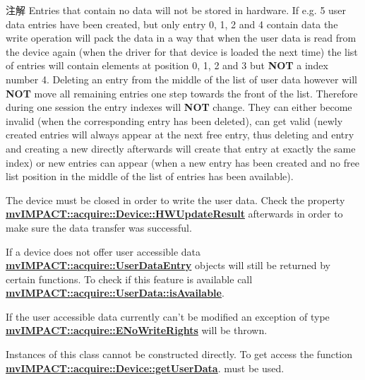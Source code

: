 \begin{DoxyNote}{注解}
Entries that contain no data will not be stored in hardware. If e.\+g. 5 user data entries have been created, but only entry 0, 1, 2 and 4 contain data the write operation will pack the data in a way that when the user data is read from the device again (when the driver for that device is loaded the next time) the list of entries will contain elements at position 0, 1, 2 and 3 but {\bfseries N\+O\+T} a index number 4. Deleting an entry from the middle of the list of user data however will {\bfseries N\+O\+T} move all remaining entries one step towards the front of the list. Therefore during one session the entry indexes will {\bfseries N\+O\+T} change. They can either become invalid (when the corresponding entry has been deleted), can get valid (newly created entries will always appear at the next free entry, thus deleting and entry and creating a new directly afterwards will create that entry at exactly the same index) or new entries can appear (when a new entry has been created and no free list position in the middle of the list of entries has been available).

The device must be closed in order to write the user data. Check the property {\bfseries \hyperlink{classmv_i_m_p_a_c_t_1_1acquire_1_1_device_a8e6d960358632d3e55f2f20474a3aa26}{mv\+I\+M\+P\+A\+C\+T\+::acquire\+::\+Device\+::\+H\+W\+Update\+Result}} afterwards in order to make sure the data transfer was successful.

If a device does not offer user accessible data {\bfseries \hyperlink{classmv_i_m_p_a_c_t_1_1acquire_1_1_user_data_entry}{mv\+I\+M\+P\+A\+C\+T\+::acquire\+::\+User\+Data\+Entry}} objects will still be returned by certain functions. To check if this feature is available call {\bfseries \hyperlink{classmv_i_m_p_a_c_t_1_1acquire_1_1_user_data_a1b86acbf21478b9eb2ea528d67cbfe09}{mv\+I\+M\+P\+A\+C\+T\+::acquire\+::\+User\+Data\+::is\+Available}}.

If the user accessible data currently can't be modified an exception of type {\bfseries \hyperlink{classmv_i_m_p_a_c_t_1_1acquire_1_1_e_no_write_rights}{mv\+I\+M\+P\+A\+C\+T\+::acquire\+::\+E\+No\+Write\+Rights}} will be thrown.

Instances of this class cannot be constructed directly. To get access the function {\bfseries \hyperlink{classmv_i_m_p_a_c_t_1_1acquire_1_1_device_a08734e0c6fd862e3c6e7160c66b927ec}{mv\+I\+M\+P\+A\+C\+T\+::acquire\+::\+Device\+::get\+User\+Data}}. must be used. 
\end{DoxyNote}


